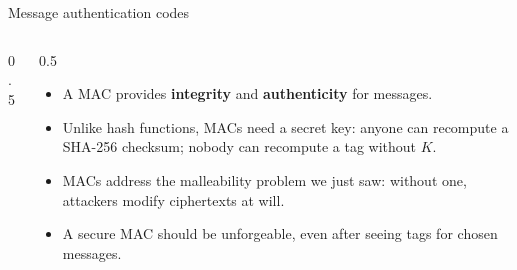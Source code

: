 \ifdefined\PRESENTATION\else\PassOptionsToClass{handout}{beamer}\fi\documentclass[aspectratio=169, lualatex]{beamer}
\begin{document}
\begin{frame}{Message authentication codes}
	\begin{columns}[c]
		\begin{column}{0.5\textwidth}
		\end{column}
		\begin{column}{0.5\textwidth}
			\begin{itemize}
				\item A MAC provides \textbf{integrity} and \textbf{authenticity} for messages.
				\item Unlike hash functions, MACs need a secret key: anyone can recompute a SHA-256 checksum; nobody can recompute a tag without $K$.
				\item MACs address the malleability problem we just saw: without one, attackers modify ciphertexts at will.
				\item A secure MAC should be unforgeable, even after seeing tags for chosen messages.
			\end{itemize}
		\end{column}
	\end{columns}
\end{frame}
\end{document}
